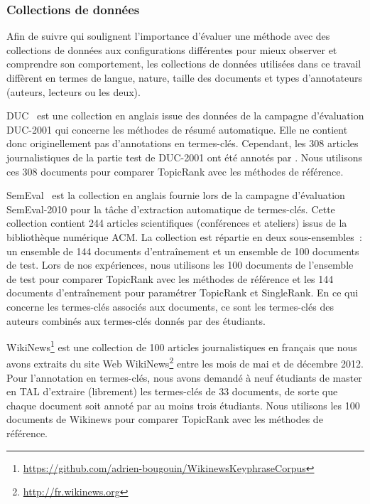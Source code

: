     \subsubsection{Collections de données}
    \label{subsubsec:donnees_de_test}
      Afin de suivre  qui soulignent l'importance
      d'évaluer une méthode avec des collections de données aux configurations
      différentes pour mieux observer et comprendre son comportement, les
      collections de données utilisées dans ce travail diffèrent en termes de
      langue, nature, taille des documents et types d'annotateurs (auteurs,
      lecteurs ou les deux).

      DUC~\cite{over2001duc} est une collection en anglais issue des
      données de la campagne d'évaluation DUC-2001 qui concerne les méthodes de
      résumé automatique. Elle ne contient donc originellement pas d'annotations
      en termes-clés. Cependant, les 308 articles journalistiques de la partie
      test de DUC-2001 ont été annotés par . Nous
      utilisons ces 308 documents pour comparer TopicRank avec les méthodes de
      référence.

      SemEval~\cite{kim2010semeval} est la collection en anglais
      fournie lors de la campagne d'évaluation SemEval-2010 pour la tâche
      d'extraction automatique de termes-clés. Cette collection contient 244
      articles scientifiques (conférences et ateliers) issus de la bibliothèque
      numérique ACM. La collection est répartie en deux sous-ensembles~: un
      ensemble de 144 documents d'entraînement et un ensemble de 100 documents
      de test. Lors de nos expériences, nous utilisons les 100 documents de
      l'ensemble de test pour comparer TopicRank avec les méthodes de
      référence et les 144 documents d'entraînement pour paramétrer TopicRank et
      SingleRank. En ce qui concerne les termes-clés associés aux documents, ce
      sont les termes-clés des auteurs combinés aux termes-clés donnés par des
      étudiants.

      WikiNews\footnote{\url{https://github.com/adrien-bougouin/WikinewsKeyphraseCorpus}}
      est une collection de 100 articles journalistiques en français que nous
      avons extraits du site Web
      WikiNews\footnote{\url{http://fr.wikinews.org}} entre les mois de mai et
      de décembre 2012. Pour l'annotation en termes-clés, nous avons demandé à
      neuf étudiants de master en TAL d'extraire (librement) les termes-clés de
      33 documents, de sorte que chaque document soit annoté par au moins trois
      étudiants. Nous utilisons les 100 documents de Wikinews pour comparer
      TopicRank avec les méthodes de référence.


